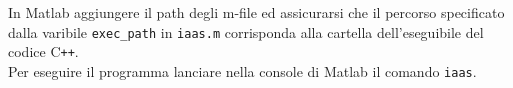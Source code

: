 \documentclass[12pt]{report}
\begin{document}
\noindent In Matlab aggiungere il path degli m-file ed assicurarsi che il percorso specificato dalla varibile \verb|exec_path| in \verb|iaas.m| corrisponda alla cartella dell'eseguibile del codice C\verb|++|.\\
Per eseguire il programma lanciare nella console di Matlab il comando \verb|iaas|.

\printbibliography
\end{document}
